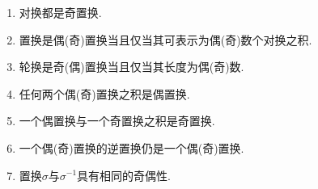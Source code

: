 \documentclass[../../main.tex]{subfiles}%
\begin{document}
\begin{corollary}\label{corollary:奇置换与偶置换分别可表示成奇数和偶数个对换之积}
\begin{enumerate}[(1)]
\item\label{corollary:奇置换与偶置换分别可表示成奇数和偶数个对换之积-1} 对换都是奇置换.

\item\label{corollary:奇置换与偶置换分别可表示成奇数和偶数个对换之积-2} 置换是偶(奇)置换当且仅当其可表示为偶(奇)数个对换之积.

\item\label{corollary:奇置换与偶置换分别可表示成奇数和偶数个对换之积-3} 轮换是奇(偶)置换当且仅当其长度为偶(奇)数.

\item\label{corollary:奇置换与偶置换分别可表示成奇数和偶数个对换之积-4} 任何两个偶(奇)置换之积是偶置换.

\item\label{corollary:奇置换与偶置换分别可表示成奇数和偶数个对换之积-5} 一个偶置换与一个奇置换之积是奇置换.

\item\label{corollary:奇置换与偶置换分别可表示成奇数和偶数个对换之积-6} 一个偶(奇)置换的逆置换仍是一个偶(奇)置换.

\item\label{corollary:奇置换与偶置换分别可表示成奇数和偶数个对换之积-7} 置换$\sigma$与$\sigma^{-1}$具有相同的奇偶性.
\end{enumerate}
\end{corollary}
\end{document}
